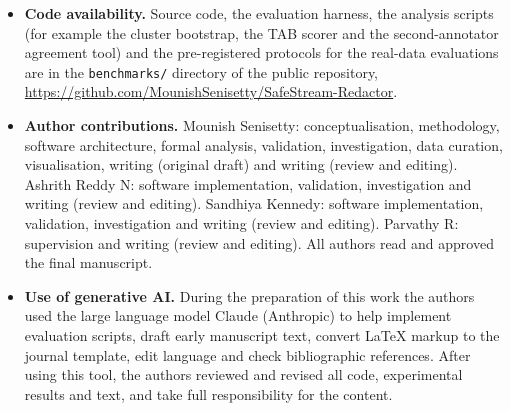 \documentclass[pdflatex,sn-mathphys-num]{sn-jnl}
\theoremstyle{thmstyleone}
\theoremstyle{thmstylethree}
\begin{document}
\begin{itemize}
\item \textbf{Code availability.} Source code, the evaluation harness, the analysis scripts (for example the cluster bootstrap, the TAB scorer and the second-annotator agreement tool) and the pre-registered protocols for the real-data evaluations are in the \texttt{benchmarks/} directory of the public repository, \url{https://github.com/MounishSenisetty/SafeStream-Redactor}.
\item \textbf{Author contributions.} Mounish Senisetty: conceptualisation, methodology, software architecture, formal analysis, validation, investigation, data curation, visualisation, writing (original draft) and writing (review and editing). Ashrith Reddy N: software implementation, validation, investigation and writing (review and editing). Sandhiya Kennedy: software implementation, validation, investigation and writing (review and editing). Parvathy R: supervision and writing (review and editing). All authors read and approved the final manuscript.
\item \textbf{Use of generative AI.} During the preparation of this work the authors used the large language model Claude (Anthropic) to help implement evaluation scripts, draft early manuscript text, convert \LaTeX{} markup to the journal template, edit language and check bibliographic references. After using this tool, the authors reviewed and revised all code, experimental results and text, and take full responsibility for the content.
\end{itemize}
\end{document}
